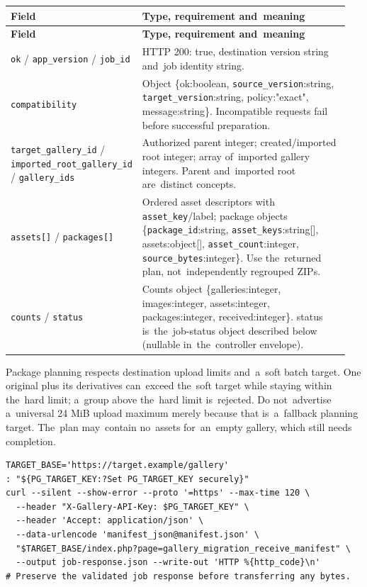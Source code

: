 \documentclass[11pt,a4paper]{article}
\newcommand{\codeword}[1]{\nolinkurl{#1}}
\begin{document}
\begin{longtable}{@{}>{\RaggedRight\arraybackslash}p{0.28\linewidth}>{\RaggedRight\arraybackslash}p{0.67\linewidth}@{}}
\toprule
\textbf{Field} & \textbf{Type, requirement and~meaning} \\
\midrule
\endfirsthead
\toprule
\textbf{Field} & \textbf{Type, requirement and~meaning} \\
\midrule
\endhead
\bottomrule
\endfoot
\codeword{ok} / \codeword{app_version} / \codeword{job_id} & HTTP 200: true, destination
version string and~job identity string. \\
\codeword{compatibility} & Object \{ok:boolean, \codeword{source_version}:string,
\codeword{target_version}:string, policy:"exact", message:string\}. Incompatible requests
fail before successful preparation. \\
\codeword{target_gallery_id} / \codeword{imported_root_gallery_id} / \codeword{gallery_ids}
& Authorized parent integer; created/imported root integer; array of~imported gallery
integers. Parent and~imported root are~distinct concepts. \\
\codeword{assets[]} / \codeword{packages[]} & Ordered asset descriptors with
\codeword{asset_key}/label; package objects \{\codeword{package_id}:string,
\codeword{asset_keys}:string[], assets:object[], \codeword{asset_count}:integer,
\codeword{source_bytes}:integer\}. Use the~returned plan, not~independently regrouped ZIPs.
\\
\codeword{counts} / \codeword{status} & Counts object \{galleries:integer, images:integer,
assets:integer, packages:integer, received:integer\}. status is~the~job-status object
described below (nullable in~the~controller envelope). \\
\end{longtable}

Package planning respects destination upload limits and~a~soft batch target. One original
plus its derivatives can~exceed the~soft target while staying within the~hard limit; a~group
above the~hard limit is~rejected. Do not~advertise a~universal 24 MiB upload maximum merely
because that is~a~fallback planning target. The~plan may~contain no~assets for~an~empty
gallery, which still needs completion.

\begin{lstlisting}[language={}]
TARGET_BASE='https://target.example/gallery'
: "${PG_TARGET_KEY:?Set PG_TARGET_KEY securely}"
curl --silent --show-error --proto '=https' --max-time 120 \
  --header "X-Gallery-API-Key: $PG_TARGET_KEY" \
  --header 'Accept: application/json' \
  --data-urlencode 'manifest_json@manifest.json' \
  "$TARGET_BASE/index.php?page=gallery_migration_receive_manifest" \
  --output job-response.json --write-out 'HTTP %{http_code}\n'
# Preserve the validated job response before transferring any bytes.
\end{lstlisting}
\end{document}
